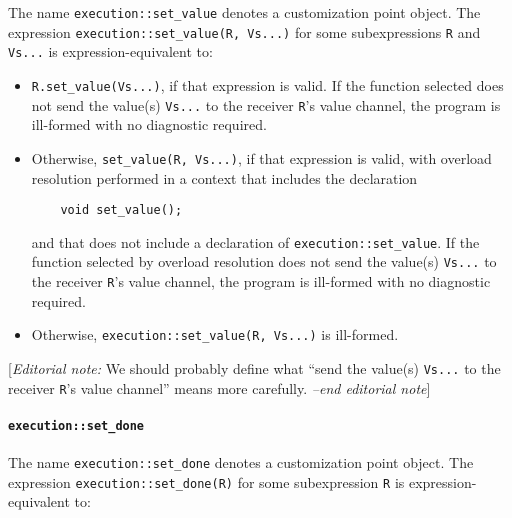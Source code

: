 \documentclass[a4paper,12pt,notitlepage,twoside,openright]{article}
\begin{document}
The name \texttt{execution::set_value} denotes a
customization point object. The expression
\texttt{execution::set_value(R, Vs...)} for some
subexpressions \texttt{R} and \texttt{Vs...} is
expression-equivalent to:

\begin{itemize}
\item
  \texttt{R.set_value(Vs...)}, if that expression is valid.
  If the function selected does not send the value(s)
  \texttt{Vs...} to the receiver \texttt{R}'s
  value channel, the program is ill-formed with no diagnostic required.
\item
  Otherwise, \texttt{set_value(R, Vs...)}, if that
  expression is valid, with overload resolution performed in a context
  that includes the declaration

  \begin{verbatim}
    void set_value();
  \end{verbatim}

  and that does not include a declaration of
  \texttt{execution::set_value}. If the function selected by
  overload resolution does not send the value(s)
  \texttt{Vs...} to the receiver \texttt{R}'s
  value channel, the program is ill-formed with no diagnostic required.
\item
  Otherwise, \texttt{execution::set_value(R, Vs...)} is
  ill-formed.
\end{itemize}

{[}\emph{Editorial note:} We should probably define what ``send the
value(s) \texttt{Vs...} to the receiver
\texttt{R}'s value channel'' means more carefully.
\emph{--end editorial note}{]}

\hypertarget{executionset_done}{%
\paragraph{\texorpdfstring{\texttt{execution::set_done}}{}}\label{executionset_done}}

The name \texttt{execution::set_done} denotes a
customization point object. The expression
\texttt{execution::set_done(R)} for some subexpression
\texttt{R} is expression-equivalent to:
\end{document}
